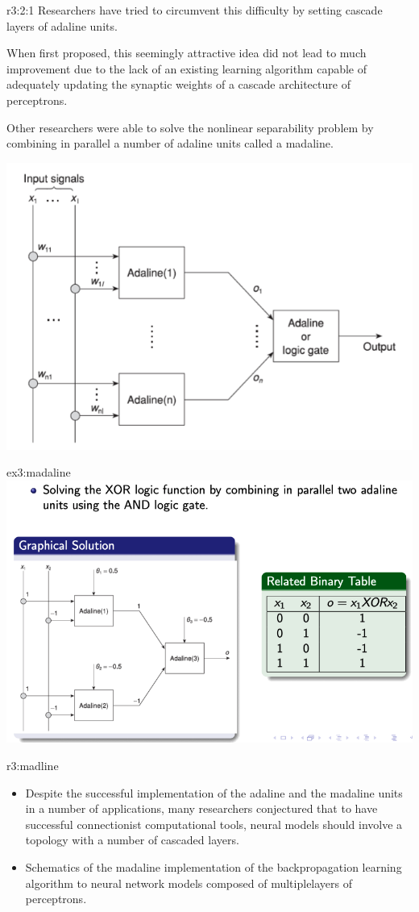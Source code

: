 \documentclass{tron}
\begin{document}
\begin{remark}[Madaline]{r3:2:1}
	Researchers have tried to circumvent this diﬃculty by setting cascade layers of adaline units.

	When ﬁrst proposed, this seemingly attractive idea did not lead to much improvement due to the lack of an existing learning algorithm capable of adequately updating the synaptic weights of a cascade architecture of perceptrons.
	
	Other researchers were able to solve the nonlinear separability problem by combining in parallel a number of adaline units called a madaline.

\includegraphics[width=0.5\columnwidth]{Figs/Lec4/madaline}

\begin{example}[Madaline]{ex3:madaline}
	\includegraphics[width=0.8\columnwidth]{Figs/Lec4/madaline_ex}	
\end{example}
\end{remark}

\begin{remark}[Madaline]{r3:madline}
	\begin{itemize}
		\item Despite the successful implementation of the adaline and the madaline units in a number of applications, many researchers conjectured that to have successful connectionist computational tools, neural models should involve a topology with a number of cascaded layers.
		\item Schematics of the madaline implementation of the backpropagation learning algorithm to neural network models composed of multiplelayers of perceptrons.
	\end{itemize}
\end{remark}
\end{document}
